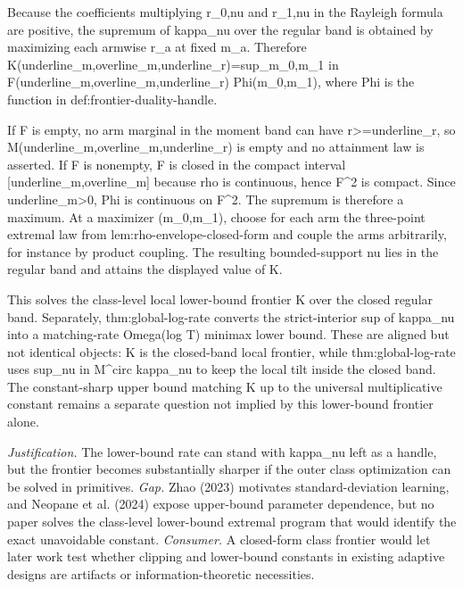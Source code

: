 \documentclass{article}
\begin{document}
Because the coefficients multiplying r_{0,nu} and r_{1,nu} in the Rayleigh formula are positive, the supremum of kappa_nu over the regular band is obtained by maximizing each armwise r_a at fixed m_a. Therefore K(underline_m,overline_m,underline_r)=sup_{m_0,m_1 in F(underline_m,overline_m,underline_r)} Phi(m_0,m_1), where Phi is the function in def:frontier-duality-handle.

If F is empty, no arm marginal in the moment band can have r>=underline_r, so M(underline_m,overline_m,underline_r) is empty and no attainment law is asserted. If F is nonempty, F is closed in the compact interval [underline_m,overline_m] because rho is continuous, hence F^2 is compact. Since underline_m>0, Phi is continuous on F^2. The supremum is therefore a maximum. At a maximizer (m_0,m_1), choose for each arm the three-point extremal law from lem:rho-envelope-closed-form and couple the arms arbitrarily, for instance by product coupling. The resulting bounded-support nu lies in the regular band and attains the displayed value of K.

This solves the class-level local lower-bound frontier K over the closed regular band. Separately, thm:global-log-rate converts the strict-interior sup of kappa_nu into a matching-rate Omega(log T) minimax lower bound. These are aligned but not identical objects: K is the closed-band local frontier, while thm:global-log-rate uses sup_{nu in M^circ} kappa_nu to keep the local tilt inside the closed band. The constant-sharp upper bound matching K up to the universal multiplicative constant remains a separate question not implied by this lower-bound frontier alone.
\par\smallskip\noindent \textit{Justification.} The lower-bound rate can stand with kappa_nu left as a handle, but the frontier becomes substantially sharper if the outer class optimization can be solved in primitives. \textit{Gap.} Zhao (2023) motivates standard-deviation learning, and Neopane et al. (2024) expose upper-bound parameter dependence, but no paper solves the class-level lower-bound extremal program that would identify the exact unavoidable constant. \textit{Consumer.} A closed-form class frontier would let later work test whether clipping and lower-bound constants in existing adaptive designs are artifacts or information-theoretic necessities.
\end{document}
